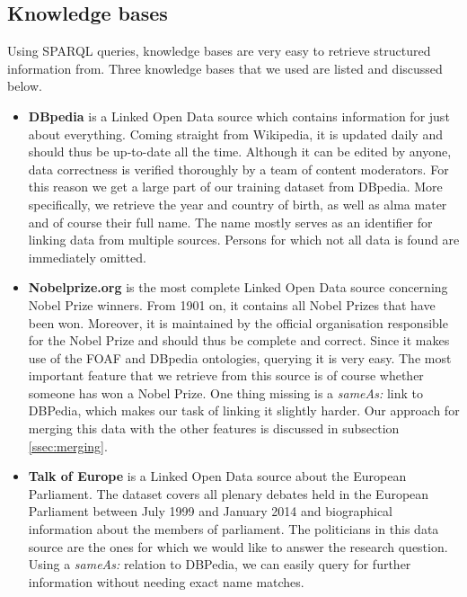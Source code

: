 \subsection{Knowledge bases}
\label{ssec:knowledgebases}

Using SPARQL queries, knowledge bases are very easy to retrieve structured information from. Three knowledge bases that we used are listed and discussed below.

\begin{itemize}
\item{\textbf{DBpedia}} is a Linked Open Data source which contains information for just about everything. Coming straight from Wikipedia, it is updated daily and should thus be up-to-date all the time. Although it can be edited by anyone, data correctness is verified thoroughly by a team of content moderators. For this reason we get a large part of our training dataset from DBpedia. More specifically, we retrieve the year and country of birth, as well as alma mater and of course their full name. The name mostly serves as an identifier for linking data from multiple sources. Persons for which not all data is found are immediately omitted.

\item{\textbf{Nobelprize.org}} is the most complete Linked Open Data source concerning Nobel Prize winners. From 1901 on, it contains all Nobel Prizes that have been won. Moreover, it is maintained by the official organisation responsible for the Nobel Prize and should thus be complete and correct. Since it makes use of the FOAF and DBpedia ontologies, querying it is very easy. The most important feature that we retrieve from this source is of course whether someone has won a Nobel Prize. One thing missing is a \emph{sameAs:} link to DBPedia, which makes our task of linking it slightly harder. Our approach for merging this data with the other features is discussed in subsection \ref{ssec:merging}.

\item{\textbf{Talk of Europe}} is a Linked Open Data source about the European Parliament. The dataset covers all plenary debates held in the European Parliament between July 1999 and January 2014 and biographical information about the members of parliament. The politicians in this data source are the ones for which we would like to answer the research question. Using a \emph{sameAs:} relation to DBPedia, we can easily query for further information without needing exact name matches.
\end{itemize}


